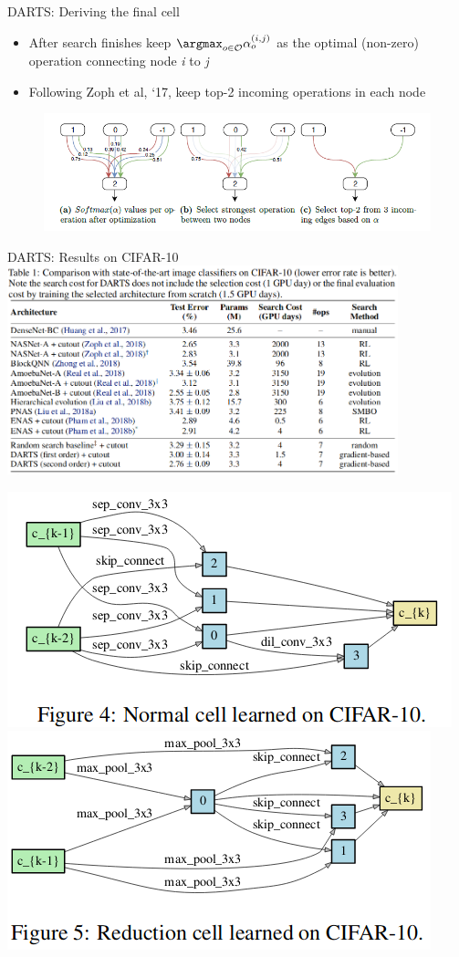 \begin{frame}{DARTS: Deriving the final cell}
    \begin{itemize}
        \item After search finishes keep $\argmax_{o\in\mathcal{O}}\alpha_{o}^{(i,j)}$ as the optimal (non-zero) operation connecting node \textit{i} to \textit{j}
        \item Following Zoph et al, ‘17, keep top-2 incoming operations in each node
    \end{itemize}

    \begin{figure}[t]
        \begin{centering}
            \includegraphics[scale=0.55]{images_lec7/genotype.png}
        \end{centering}
    \end{figure}

\end{frame}

\begin{frame}{DARTS: Results on CIFAR-10}
\centering
\includegraphics[width=0.85\textwidth]{images_lec7/darts_cnn_results.png}

\includegraphics[width=.35\textwidth]{images_lec7/darts_normal_cell.png}
\includegraphics[width=.35\textwidth]{images_lec7/darts_reduction_cell.png}

\end{frame}

